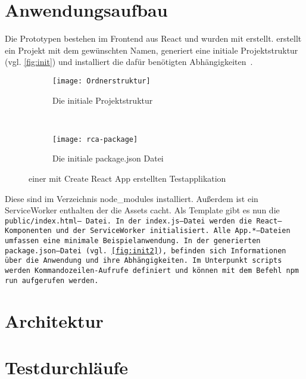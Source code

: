 \section{Anwendungsaufbau}
Die Prototypen bestehen im Frontend aus React und wurden mit  erstellt.  erstellt ein Projekt mit dem gewünschten Namen, generiert eine initiale Projektstruktur (vgl. \autoref{fig:init}) und installiert die dafür benötigten Abhängigkeiten~\cite{create-react}.
\begin{figure}[H]
  \centering
  \begin{subfigure}[t]{0.4\textwidth}
          \texttt{[image: Ordnerstruktur]}
          \caption{Die initiale Projektstruktur}
          \label{fig:init}
  \end{subfigure}
  ~
  \begin{subfigure}[t]{0.4\textwidth}
          \texttt{[image: rca-package]}
          \caption{Die initiale package.json Datei}
          \label{fig:init2}
  \end{subfigure}
  \grayRule
  \caption[Create React App: initiale Testapplikation]{einer mit Create React App erstellten Testapplikation}
  \label{fig:create-react-app}
\end{figure}
%
Diese sind im Verzeichnis node\_modules installiert.
Außerdem ist ein ServiceWorker
enthalten der die \gls{Assets} cacht.
Als Template gibt es nun die \tt{public/index.html}-- Datei. In der \tt{index.js}--Datei werden die React--Komponenten und der ServiceWorker initialisiert.
Alle \tt{App.*}--Dateien umfassen eine minimale Beispielanwendung.
In der generierten \tt{package.json}--Datei (vgl. \autoref{fig:init2}), befinden sich Informationen über die Anwendung und ihre Abhängigkeiten. Im Unterpunkt \tt{scripts} werden Kommandozeilen-Aufrufe definiert und können mit dem Befehl \tt{npm run} aufgerufen werden.
%
%

%
%
%
\section{Architektur}

%
%

%
%

%
%

%
%
\section{\label{chap:konzept:test}Testdurchläufe}

